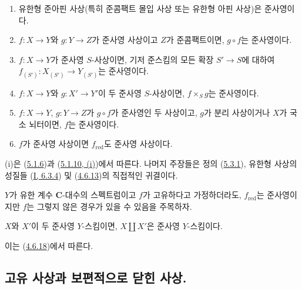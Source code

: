 \begin{proposition}[5.3.4]
\label{II.5.3.4-ko}
\begin{enumerate}
  \item[\rm{(i)}] 유한형 준아핀 사상(특히 준콤팩트 몰입 사상 또는
  유한형 아핀 사상)은 준사영이다.
  \item[\rm{(ii)}] $f:X\to Y$와 $g:Y\to Z$가 준사영 사상이고
  $Z$가 준콤팩트이면, $g\circ f$는 준사영이다.


  \item[\rm{(iii)}] $f:X\to Y$가 준사영 $S$-사상이면, 기저 준스킴의
  모든 확장 $S'\to S$에 대하여
  $f_{(S')}:X_{(S')}\to Y_{(S')}$는 준사영이다.
  \item[\rm{(iv)}] $f:X\to Y$와 $g:X'\to Y'$이 두 준사영
  $S$-사상이면, $f\times_Sg$는 준사영이다.
  \item[\rm{(v)}] $f:X\to Y$, $g:Y\to Z$가 $g\circ f$가 준사영인
  두 사상이고, $g$가 분리 사상이거나 $X$가 국소 뇌터이면, $f$는
  준사영이다.
  \item[\rm{(vi)}] $f$가 준사영 사상이면 $f_{\mathrm{red}}$도
  준사영 사상이다.
\end{enumerate}
\end{proposition}

(i)은 (\hyperref[II.5.1.6-ko]{5.1.6})과
(\hyperref[II.5.1.10-ko]{5.1.10, (i)})에서 따른다. 나머지 주장들은
정의 (\hyperref[II.5.3.1-ko]{5.3.1}), 유한형 사상의 성질들
(\hyperref[I.6.3.4-ko]{I, 6.3.4}) 및
(\hyperref[II.4.6.13-ko]{4.6.13})의 직접적인 귀결이다.

\begin{remark}[5.3.5]
\label{II.5.3.5-ko}
$Y$가 유한 계수 $\mathbf{C}$-대수의 스펙트럼이고 $f$가 고유하다고
가정하더라도, $f_{\mathrm{red}}$는 준사영이지만 $f$는 그렇지 않은
경우가 있을 수 있음을 주목하자.
\end{remark}

\begin{corollary}[5.3.6]
\label{II.5.3.6-ko}
$X$와 $X'$이 두 준사영 $Y$-스킴이면, $X\amalg X'$은 준사영
$Y$-스킴이다.
\end{corollary}

이는 (\hyperref[II.4.6.18-ko]{4.6.18})에서 따른다.

\subsection{고유 사상과 보편적으로 닫힌 사상.}
\label{subsection:II.5.4-ko}
\label{II.5.4-ko}

